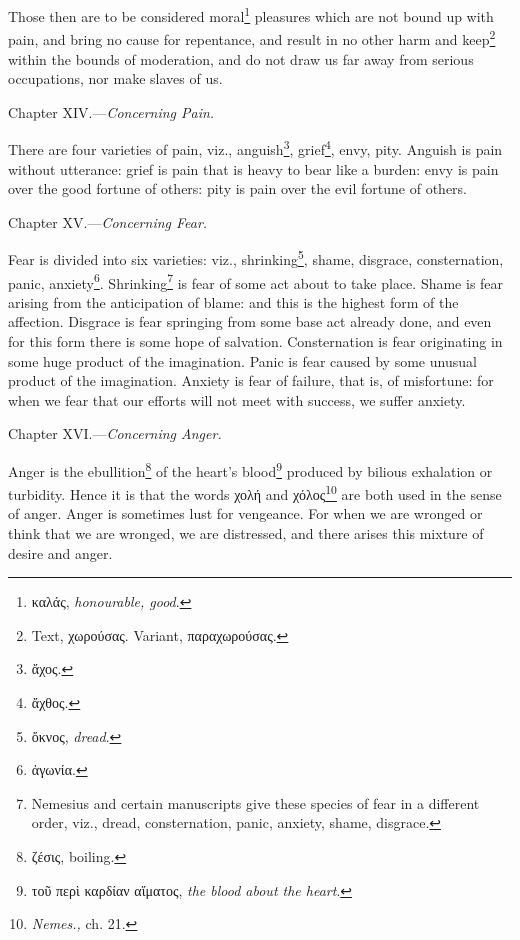Those then are to be considered moral\footnote{\textgreek{καλάς}, \emph{honourable, good}.} pleasures which are not bound up with pain, and bring no cause for repentance, and result in no other harm and keep\footnote{Text, \textgreek{χωρούσας}. Variant, \textgreek{παραχωρούσας}.} within the bounds of moderation, and do not draw us far away from serious occupations, nor make slaves of us.


Chapter XIV.—\emph{Concerning Pain.}

There are four varieties of pain, viz., anguish\footnote{\textgreek{ἄχος}.}, grief\footnote{\textgreek{ἄχθος}.}, envy, pity. Anguish is pain without utterance: grief is pain that is heavy to bear like a burden: envy is pain over the good fortune of others: pity is pain over the evil fortune of others.


Chapter XV.—\emph{Concerning Fear.}

Fear is divided into six varieties: viz., shrinking\footnote{\textgreek{ὄκνος}, \emph{dread}.}, shame, disgrace, consternation, panic, anxiety\footnote{\textgreek{ἀγωνία}.}. Shrinking\footnote{Nemesius and certain manuscripts give these species of fear in a different order, viz., dread, consternation, panic, anxiety, shame, disgrace.} is fear of some act about to take place. Shame is fear arising from the anticipation of blame: and this is the highest form of the affection. Disgrace is fear springing from some base act already done, and even for this form there is some hope of salvation. Consternation is fear originating in some huge product of the imagination. Panic is fear caused by some unusual product of the imagination. Anxiety is fear of failure, that is, of misfortune: for when we fear that our efforts will not meet with success, we suffer anxiety.


Chapter XVI.—\emph{Concerning Anger.}

Anger is the ebullition\footnote{\textgreek{ζέσις}, boiling.} of the heart’s blood\footnote{\textgreek{τοῦ περὶ καρδίαν αἵματος}, \emph{the blood about the heart}.} produced by bilious exhalation or turbidity. Hence it is that the words \textgreek{χολή} and \textgreek{χόλος}\footnote{\emph{Nemes., }ch. 21.} are both used in the sense of anger. Anger is sometimes lust for vengeance. For when we are wronged or think that we are wronged, we are distressed, and there arises this mixture of desire and anger.

